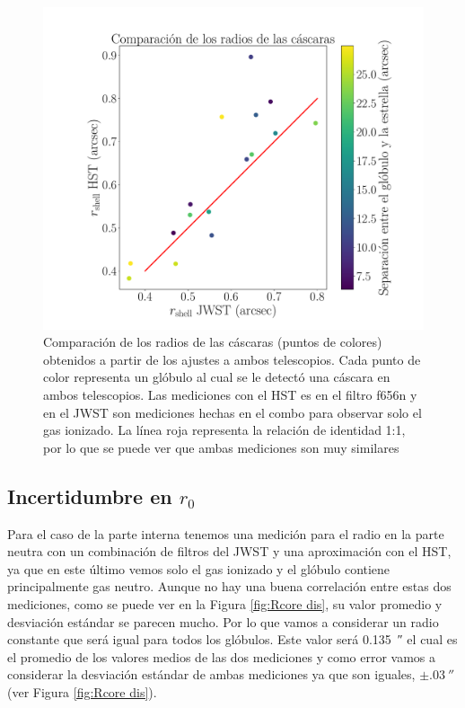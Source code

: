 \documentclass{book}
\begin{document}
\begin{figure}[htb]
    \centering
    \includegraphics[width=\textwidth]{imagenes_corregidas/rshell.pdf}
    \caption{Comparación de los radios de las cáscaras (puntos de
      colores) obtenidos a partir de los ajustes a ambos telescopios.
      Cada punto de color representa un glóbulo al cual se le detectó
      una cáscara en ambos telescopios. Las mediciones con el HST es
      en el filtro f656n y en el JWST son mediciones hechas en el
      combo para observar solo el gas ionizado. La línea roja
      representa la relación de identidad 1:1, por lo que se puede ver
      que ambas mediciones son muy similares}
    \label{fgi: Radios de la cascara}
\end{figure}

\subsection{\boldmath Incertidumbre en $r_0$}

Para el caso de la parte interna tenemos una medición para el radio en
la parte neutra con un combinación de filtros del JWST y una
aproximación con el HST, ya que en este último vemos solo el gas
ionizado y el glóbulo contiene principalmente gas neutro. Aunque no
hay una buena correlación entre estas dos mediciones, como se puede
ver en la Figura \ref{fig:Rcore dis}, su valor promedio y desviación
estándar se parecen mucho. Por lo que vamos a considerar un radio
constante que será igual para todos los glóbulos. Este valor será
\SI{0.135}{\arcsecond} el cual es el promedio de los valores medios de
las dos mediciones y como error vamos a considerar la desviación
estándar de ambas mediciones ya que son iguales,
$\pm\SI{.03}{\arcsecond}$ (ver Figura \ref{fig:Rcore dis}).
\end{document}
